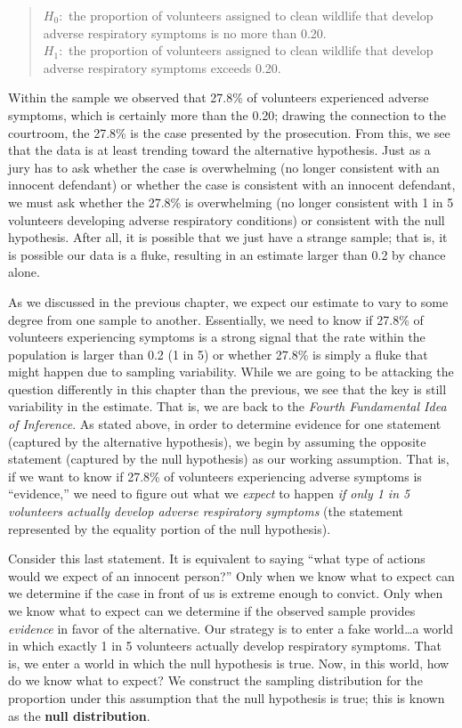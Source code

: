 \documentclass[
  letterpaper,
  DIV=11,
  numbers=noendperiod]{scrreprt}
\theoremstyle{definition}
\theoremstyle{definition}
\theoremstyle{plain}
\theoremstyle{remark}
\begin{document}
\begin{quote}
\(H_0:\) the proportion of volunteers assigned to clean wildlife that
develop adverse respiratory symptoms is no more than 0.20.\\
\(H_1:\) the proportion of volunteers assigned to clean wildlife that
develop adverse respiratory symptoms exceeds 0.20.
\end{quote}

Within the sample we observed that 27.8\% of volunteers experienced
adverse symptoms, which is certainly more than the 0.20; drawing the
connection to the courtroom, the 27.8\% is the case presented by the
prosecution. From this, we see that the data is at least trending toward
the alternative hypothesis. Just as a jury has to ask whether the case
is overwhelming (no longer consistent with an innocent defendant) or
whether the case is consistent with an innocent defendant, we must ask
whether the 27.8\% is overwhelming (no longer consistent with 1 in 5
volunteers developing adverse respiratory conditions) or consistent with
the null hypothesis. After all, it is possible that we just have a
strange sample; that is, it is possible our data is a fluke, resulting
in an estimate larger than 0.2 by chance alone.

As we discussed in the previous chapter, we expect our estimate to vary
to some degree from one sample to another. Essentially, we need to know
if 27.8\% of volunteers experiencing symptoms is a strong signal that
the rate within the population is larger than 0.2 (1 in 5) or whether
27.8\% is simply a fluke that might happen due to sampling variability.
While we are going to be attacking the question differently in this
chapter than the previous, we see that the key is still variability in
the estimate. That is, we are back to the \emph{Fourth Fundamental Idea
of Inference}. As stated above, in order to determine evidence for one
statement (captured by the alternative hypothesis), we begin by assuming
the opposite statement (captured by the null hypothesis) as our working
assumption. That is, if we want to know if 27.8\% of volunteers
experiencing adverse symptoms is ``evidence,'' we need to figure out
what we \emph{expect} to happen \emph{if only 1 in 5 volunteers actually
develop adverse respiratory symptoms} (the statement represented by the
equality portion of the null hypothesis).

Consider this last statement. It is equivalent to saying ``what type of
actions would we expect of an innocent person?'' Only when we know what
to expect can we determine if the case in front of us is extreme enough
to convict. Only when we know what to expect can we determine if the
observed sample provides \emph{evidence} in favor of the alternative.
Our strategy is to enter a fake world\ldots a world in which exactly 1
in 5 volunteers actually develop respiratory symptoms. That is, we enter
a world in which the null hypothesis is true. Now, in this world, how do
we know what to expect? We construct the sampling distribution for the
proportion under this assumption that the null hypothesis is true; this
is known as the \textbf{null distribution}.
\end{document}

